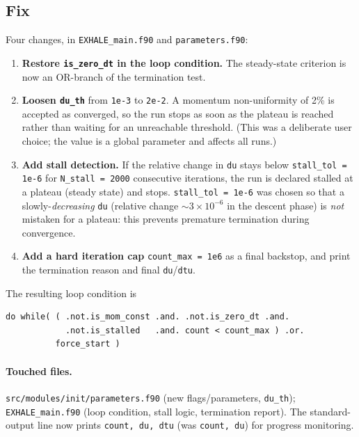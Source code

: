 \documentclass[english,a4paper]{my_memo}
\begin{document}
\subsection{Fix}
Four changes, in \texttt{EXHALE\_main.f90} and \texttt{parameters.f90}:
\begin{enumerate}
\item \textbf{Restore \texttt{is\_zero\_dt} in the loop condition.} The
  steady-state criterion is now an OR-branch of the termination test.
\item \textbf{Loosen \texttt{du\_th}} from \verb|1e-3| to \verb|2e-2|. A momentum
  non-uniformity of 2\% is accepted as converged, so the run stops as soon as the
  plateau is reached rather than waiting for an unreachable threshold. (This was a
  deliberate user choice; the value is a global parameter and affects all runs.)
\item \textbf{Add stall detection.} If the relative change in \texttt{du} stays
  below \verb|stall_tol = 1e-6| for \verb|N_stall = 2000| consecutive iterations,
  the run is declared stalled at a plateau (steady state) and stops.
  \verb|stall_tol = 1e-6| was chosen so that a slowly-\emph{decreasing} \texttt{du}
  (relative change $\sim 3\times10^{-6}$ in the descent phase) is \emph{not}
  mistaken for a plateau: this prevents premature termination during convergence.
\item \textbf{Add a hard iteration cap} \verb|count_max = 1e6| as a final backstop,
  and print the termination reason and final \texttt{du}/\texttt{dtu}.
\end{enumerate}
The resulting loop condition is
\begin{lstlisting}
do while( ( .not.is_mom_const .and. .not.is_zero_dt .and.
            .not.is_stalled   .and. count < count_max ) .or.
          force_start )
\end{lstlisting}

\paragraph{Touched files.} \texttt{src/modules/init/parameters.f90} (new
flags/parameters, \texttt{du\_th}); \texttt{EXHALE\_main.f90} (loop condition, stall
logic, termination report). The standard-output line now prints
\texttt{count, du, dtu} (was \texttt{count, du}) for progress monitoring.
\end{document}
